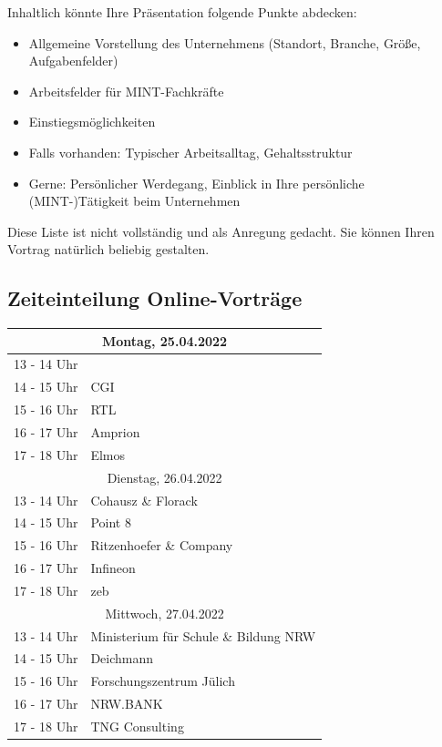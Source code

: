 \documentclass[
  paper=a4,
  fontsize=12pt,
  DIV=16,
  headheight=30pt,
  footheight=45pt,
  headinclude,
  parskip=half,
]{scrartcl}
\begin{document}
Inhaltlich könnte Ihre Präsentation folgende Punkte abdecken:
\begin{itemize}
    \item Allgemeine Vorstellung des Unternehmens (Standort, Branche, Größe, Aufgabenfelder)
    \item Arbeitsfelder für MINT-Fachkräfte
    \item Einstiegsmöglichkeiten
    \item Falls vorhanden: Typischer Arbeitsalltag, Gehaltsstruktur
    \item Gerne: Persönlicher Werdegang, Einblick in Ihre persönliche (MINT-)Tätigkeit beim Unternehmen
\end{itemize} 

Diese Liste ist nicht vollständig und als Anregung gedacht.
Sie können Ihren Vortrag natürlich beliebig gestalten.

\subsection*{Zeiteinteilung Online-Vorträge}

\begin{table}[h!]
    \centering
\begin{tabular}{|c|l|}
    \hline
    \multicolumn{2}{|c|}{Montag, 25.04.2022} \\
    \hline
    \rowcolor{gray!10} 13 - 14 Uhr &  \\
    \rowcolor{gray!30} 14 - 15 Uhr & CGI \\
    \rowcolor{gray!10} 15 ­- 16 Uhr & RTL \\
    \rowcolor{gray!30} 16 - 17 Uhr & Amprion\\
    \rowcolor{gray!10} 17 ­- 18 Uhr & Elmos \\
    \hline
    \multicolumn{2}{|c|}{Dienstag, 26.04.2022} \\
    \hline
    \rowcolor{gray!10} 13 - 14 Uhr & Cohausz \& Florack \\
    \rowcolor{gray!30} 14 - 15 Uhr & Point 8 \\
    \rowcolor{gray!10} 15 ­- 16 Uhr & Ritzenhoefer \& Company \\
    \rowcolor{gray!30} 16 - 17 Uhr & Infineon \\
    \rowcolor{gray!10} 17 ­- 18 Uhr & zeb \\
    \hline
    \multicolumn{2}{|c|}{Mittwoch, 27.04.2022} \\
    \hline
    \rowcolor{gray!10} 13 - 14 Uhr & Ministerium für Schule \& Bildung NRW \\
    \rowcolor{gray!30} 14 - 15 Uhr & Deichmann \\
    \rowcolor{gray!10} 15 ­- 16 Uhr & Forschungszentrum Jülich \\
    \rowcolor{gray!30} 16 - 17 Uhr & NRW.BANK\\
    \rowcolor{gray!10} 17 ­- 18 Uhr & TNG Consulting \\
    \hline
    \end{tabular}

\end{table}
\end{document}
